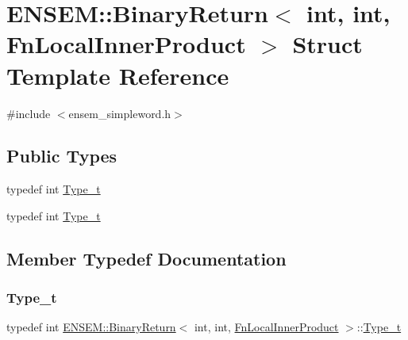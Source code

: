 \hypertarget{structENSEM_1_1BinaryReturn_3_01int_00_01int_00_01FnLocalInnerProduct_01_4}{}\section{E\+N\+S\+EM\+:\+:Binary\+Return$<$ int, int, Fn\+Local\+Inner\+Product $>$ Struct Template Reference}
\label{structENSEM_1_1BinaryReturn_3_01int_00_01int_00_01FnLocalInnerProduct_01_4}


{\ttfamily \#include $<$ensem\+\_\+simpleword.\+h$>$}

\subsection*{Public Types}
\begin{DoxyCompactItemize}
\item 
typedef int \mbox{\hyperlink{structENSEM_1_1BinaryReturn_3_01int_00_01int_00_01FnLocalInnerProduct_01_4_abc5bd3e21df0f42ad6b223a7b59549ba}{Type\+\_\+t}}
\item 
typedef int \mbox{\hyperlink{structENSEM_1_1BinaryReturn_3_01int_00_01int_00_01FnLocalInnerProduct_01_4_abc5bd3e21df0f42ad6b223a7b59549ba}{Type\+\_\+t}}
\end{DoxyCompactItemize}


\subsection{Member Typedef Documentation}
\mbox{\label{structENSEM_1_1BinaryReturn_3_01int_00_01int_00_01FnLocalInnerProduct_01_4_abc5bd3e21df0f42ad6b223a7b59549ba}} 
\subsubsection{\texorpdfstring{Type\_t}{Type\_t}\hspace{0.1cm}{\footnotesize\ttfamily [1/2]}}
{\footnotesize\ttfamily typedef int \mbox{\hyperlink{structENSEM_1_1BinaryReturn}{E\+N\+S\+E\+M\+::\+Binary\+Return}}$<$ int, int, \mbox{\hyperlink{structENSEM_1_1FnLocalInnerProduct}{Fn\+Local\+Inner\+Product}} $>$\+::\mbox{\hyperlink{structENSEM_1_1BinaryReturn_3_01int_00_01int_00_01FnLocalInnerProduct_01_4_abc5bd3e21df0f42ad6b223a7b59549ba}{Type\+\_\+t}}}

